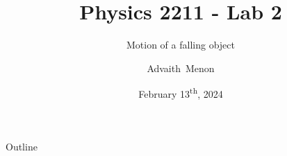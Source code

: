 \documentclass{beamer}
\title[PHYS-2211-Lab02] %
{Physics 2211 - Lab 2}
\subtitle
{Motion of a falling object} %
\author[Menon, Advaith] %
{Advaith~Menon\inst{1}}
\institute%
{
  \inst{1}%
  Computer Engineering\\
  Georgia Institute of Technology
  }
\date%
{February 13\textsuperscript{th}, 2024}
\begin{document}
\begin{frame}
  \titlepage
\end{frame}

\begin{frame}{Outline}
  \tableofcontents
\end{frame}









\end{document}
